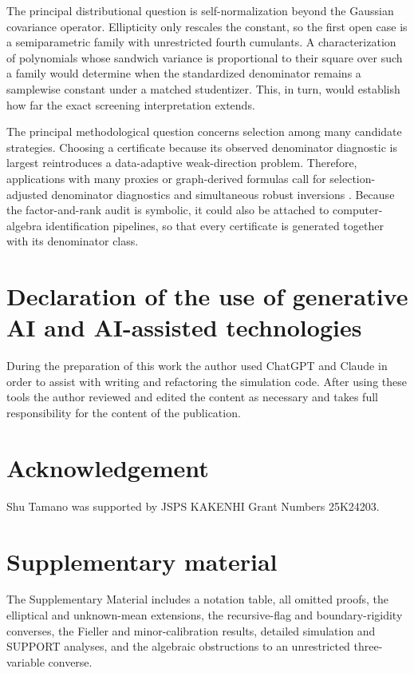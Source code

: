 \documentclass[12pt,a4paper]{article}
\theoremstyle{plain}
\theoremstyle{definition}
\begin{document}
The principal distributional question is self-normalization beyond the Gaussian covariance operator.
Ellipticity only rescales the constant, so the first open case is a semiparametric family with unrestricted fourth cumulants.
A characterization of polynomials whose sandwich variance is proportional to their square over such a family would determine when the standardized denominator remains a samplewise constant under a matched studentizer.
This, in turn, would establish how far the exact screening interpretation extends.

The principal methodological question concerns selection among many candidate strategies.
Choosing a certificate because its observed denominator diagnostic is largest reintroduces a data-adaptive weak-direction problem.
Therefore, applications with many proxies or graph-derived formulas call for selection-adjusted denominator diagnostics and simultaneous robust inversions \citep{wang2025,bennett2026}.
Because the factor-and-rank audit is symbolic, it could also be attached to computer-algebra identification pipelines, so that every certificate is generated together with its denominator class.

\section*{Declaration of the use of generative AI and AI-assisted technologies}
During the preparation of this work the author used ChatGPT and Claude in order to assist with writing and refactoring the simulation code.
After using these tools the author reviewed and edited the content as necessary and takes full responsibility for the content of the publication.

\section*{Acknowledgement}
Shu Tamano was supported by JSPS KAKENHI Grant Numbers 25K24203.

\section*{Supplementary material}
\label{SM}
The Supplementary Material includes a notation table, all omitted proofs, the elliptical and unknown-mean extensions, the recursive-flag and boundary-rigidity converses, the Fieller and minor-calibration results, detailed simulation and SUPPORT analyses, and the algebraic obstructions to an unrestricted three-variable converse.
\end{document}
